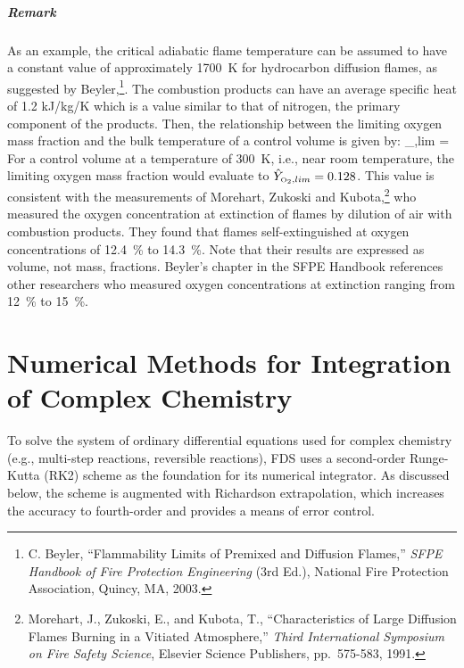 \paragraph{Remark}
As an example, the critical adiabatic flame temperature can be assumed to have a constant value of approximately
1700~K for hydrocarbon diffusion flames, as suggested by Beyler,\footnote{C. Beyler, ``Flammability Limits of Premixed and Diffusion Flames,''
{\em SFPE Handbook of Fire Protection Engineering} (3rd Ed.), National Fire
Protection Association, Quincy, MA, 2003.}. The combustion products can have an average specific heat of 1.2 kJ/kg/K which is a value similar to that of nitrogen, the primary component of the products. Then, the relationship
between the limiting oxygen mass fraction and the bulk temperature of a control volume is given
by:
\be
   _{\OTWO,lim} =  \approx  {}  \label{extinction_model}
\ee
For a control volume at a temperature of 300~K, i.e., near room temperature, the limiting oxygen
mass fraction would evaluate to $\hat{Y}_{{\tiny \hbox{O}_2},lim}=0.128$.  This value is consistent with the measurements
of Morehart, Zukoski and Kubota,\footnote{Morehart, J., Zukoski, E., and Kubota, T., ``Characteristics of Large Diffusion Flames
Burning in a Vitiated Atmosphere,'' {\em Third International Symposium on Fire Safety
Science}, Elsevier Science Publishers, pp.~575-583, 1991.} who measured the oxygen concentration at extinction of flames by dilution of air
with combustion products. They found that flames self-extinguished at oxygen concentrations of 12.4~\% to 14.3~\%. Note that their results
are expressed as volume, not mass, fractions. Beyler's chapter in the SFPE Handbook references other researchers who measured oxygen
concentrations at extinction ranging from 12~\% to 15~\%.

\chapter{Numerical Methods for Integration of Complex Chemistry}

\label{chemistry_integration}

To solve the system of ordinary differential equations used for complex chemistry (e.g., multi-step reactions, reversible reactions), FDS uses a second-order Runge-Kutta (RK2) scheme as the foundation for its numerical integrator.  As discussed below, the scheme is augmented with Richardson extrapolation, which increases the accuracy to fourth-order and provides a means of error control.


